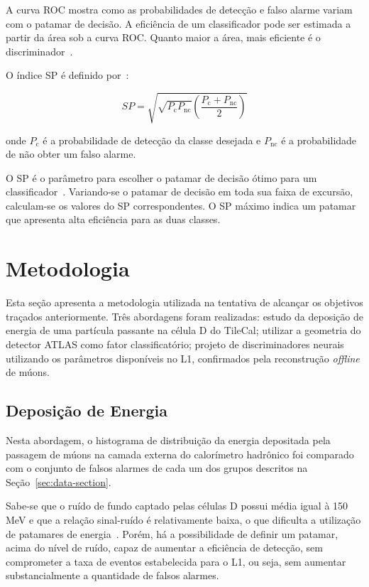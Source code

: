 A curva ROC mostra como as probabilidades de detecção e falso alarme variam com
o patamar de decisão. A eficiência de um classificador pode ser estimada a
partir da área sob a curva ROC. Quanto maior a área, mais eficiente é o
discriminador~\cite{ref:SIMAS}.

O índice SP é definido por~\cite{CIODARO2012}:

\begin{equation}
SP = \sqrt{\sqrt{P_{\text{c}}P_{\text{nc}}} \left(\frac{P_{\text{c}} +
P_{\text{nc}}}{2}\right)}
\end{equation}

\noindent onde $P_\text{c}$ é a probabilidade de detecção da classe desejada e
$P_{\text{nc}}$ é a probabilidade de não obter um falso alarme.

O SP é  o parâmetro para escolher o patamar de decisão ótimo para um
classificador~\cite{ref:SIMAS}. Variando-se o patamar de decisão em toda sua
faixa de excursão, calculam-se os valores do SP correspondentes. O SP máximo
indica um patamar que apresenta alta eficiência para as duas classes.

\section{Metodologia}

Esta seção apresenta a metodologia utilizada na tentativa de alcançar os
objetivos traçados anteriormente. Três abordagens foram realizadas: estudo da
deposição de energia de uma partícula passante na célula D do TileCal; utilizar
a geometria do detector ATLAS como fator classificatório; projeto de
discriminadores neurais utilizando os parâmetros disponíveis no L1, confirmados
pela reconstrução \emph{offline} de múons.

\subsection*{Deposição de Energia}

Nesta abordagem, o histograma de distribuição da energia depositada pela
passagem de múons na camada externa do calorímetro hadrônico foi comparado com o
conjunto de falsos alarmes de cada um dos grupos descritos na
Seção~\ref{sec:data-section}.

Sabe-se que o ruído de fundo captado pelas células D possui média igual à 150
MeV e que a relação sinal-ruído é relativamente baixa, o que dificulta a
utilização de patamares de energia~\cite{CIODARO2009}. Porém, há a possibilidade
de definir um patamar, acima do nível de ruído, capaz de aumentar a eficiência
de detecção, sem comprometer a taxa de eventos estabelecida para o L1, ou seja,
sem aumentar substancialmente a quantidade de falsos alarmes.

